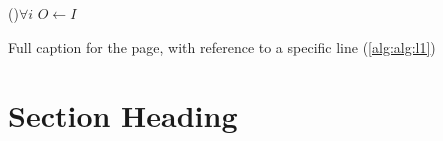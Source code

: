\documentclass{standalone}
\begin{document}
\begin{algorithm}
	\DontPrintSemicolon%

	\BlankLine%
	\BlankLine%

	\For(\textcolor{palatine}{}){$\forall i$}{
		$O \leftarrow I$\;
	}
	\BlankLine%

	\caption[Short title for list of algorithms]{Full caption for the page, with reference to a specific line (\cref{alg:alg:l1})}\label{alg:alg}
\end{algorithm}

\section{Section Heading}
\label{sec:chap1:sec1}
\Blindtext[2]
\end{document}

